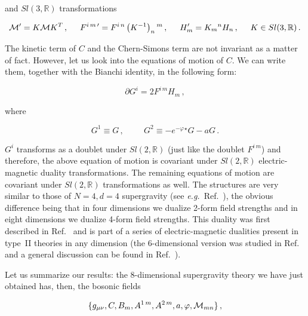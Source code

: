 \documentclass[12pt,a4paper]{article}
\begin{document}
\noindent and $Sl(3,\mathbb{R})$ transformations

\begin{equation}
{\cal M}^{\prime} = K {\cal M} K^{T}\, ,\\
\hspace{.5cm}
F^{i\, m\, \prime} = F^{i\, n}\left( K^{-1} \right)_{n}{}^{m}\, ,
\hspace{.5cm}
H^{\prime}_{m} = K_{m}{}^{n} H_{n} \, ,
\hspace{.5cm}
K \in Sl(3,\mathbb{R})\, .
\end{equation}

\noindent The kinetic term of $C$ and the Chern-Simons term are 
not invariant as a matter of fact. However, let us look into the
equations of motion of $C$. We can write them, together with the
Bianchi identity, in the following form:

\begin{equation}
\partial G^{i} =2 F^{i\, m}H_{m}\, ,  
\end{equation}

\noindent where 

\begin{equation}
\label{eq:sl2rules2}
G^{1} \equiv G\, ,
\hspace{1cm}
G^{2} \equiv -e^{-\varphi}{}^{\star} G-a G\, . 
\end{equation}

$G^{i}$ transforms as a doublet under $Sl(2,\mathbb{R})$ (just like
the doublet $F^{i\, m}$) and therefore, the above equation of motion
is covariant under $Sl(2,\mathbb{R})$ electric-magnetic duality
transformations. The remaining equations of motion are covariant under
$Sl(2,\mathbb{R})$ transformations as well. The structures are very
similar to those of $N=4,d=4$ supergravity (see {\em
  e.g.}~Ref.~\cite{kn:L-TO1}), the obvious difference being that in
four dimensions we dualize 2-form field strengths and in eight
dimensions we dualize 4-form field strengths. This duality was first
described in Ref.~\cite{kn:ILPT} and is part of a series of
electric-magnetic dualities present in type~II theories in any
dimension (the 6-dimensional version was studied in Ref.~\cite{kn:BBO}
and a general discussion can be found in Ref.~\cite{kn:L-TO2}).

Let us summarize our results: the 8-dimensional supergravity theory we
have just obtained has, then, the bosonic fields

\begin{equation}
\{g_{\mu\nu}, C, B_{m}, A^{1\, m}, A^{2\, m}, a,\varphi,{\cal M}_{mn} \}\, ,
\end{equation}
\end{document}
